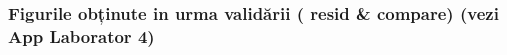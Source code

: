 \documentclass[12pt,english]{article}
\begin{document}
\subsubsection {Figurile obținute in urma validării ( resid \& compare) (vezi App Laborator 4) }
\begin{center}
\end{center}
\begin{center}
\end{center}
\begin{center}
\end{center}
\end{document}
